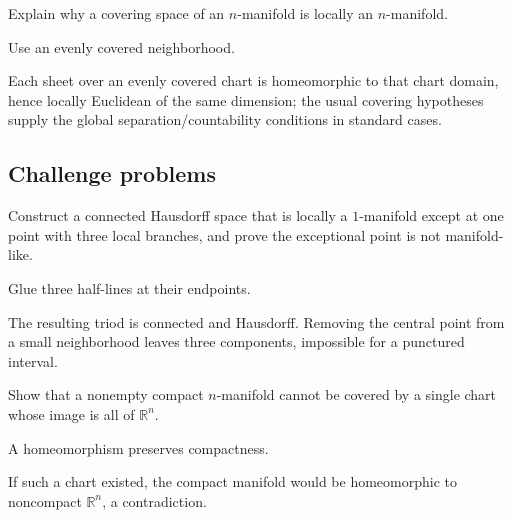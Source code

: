 \begin{exercise}\label{exr:vii01-ped-14}
Explain why a covering space of an \(n\)-manifold is locally an \(n\)-manifold.
\end{exercise}
\begin{hint}
Use an evenly covered neighborhood.
\end{hint}
\begin{solution}
Each sheet over an evenly covered chart is homeomorphic to that chart domain, hence locally Euclidean of the same dimension; the usual covering hypotheses supply the global separation/countability conditions in standard cases.
\end{solution}

\subsection*{Challenge problems}

\begin{exercise}\label{exr:vii01-ped-15}
Construct a connected Hausdorff space that is locally a \(1\)-manifold except at one point with three local branches, and prove the exceptional point is not manifold-like.
\end{exercise}
\begin{hint}
Glue three half-lines at their endpoints.
\end{hint}
\begin{solution}
The resulting triod is connected and Hausdorff.  Removing the central point from a small neighborhood leaves three components, impossible for a punctured interval.
\end{solution}

\begin{exercise}\label{exr:vii01-ped-16}
Show that a nonempty compact \(n\)-manifold cannot be covered by a single chart whose image is all of \(\mathbb R^n\).
\end{exercise}
\begin{hint}
A homeomorphism preserves compactness.
\end{hint}
\begin{solution}
If such a chart existed, the compact manifold would be homeomorphic to noncompact \(\mathbb R^n\), a contradiction.
\end{solution}

